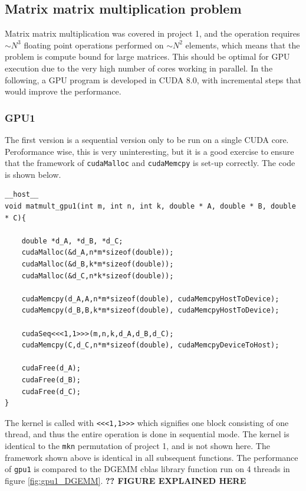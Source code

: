 \subsection{Matrix matrix multiplication problem}
Matrix matrix multiplication was covered in project 1, and the operation requires $\sim N^3$ floating point operations performed on $\sim N^2$ elements, which means that the problem is compute bound for large matrices. This should be optimal for GPU execution due to the very high number of cores working in parallel. In the following, a GPU program is developed in CUDA 8.0, with incremental steps that would improve the performance.
\subsubsection{GPU1}
The first version is a sequential version only to be run on a single CUDA core. Peroformance wise, this is very uninteresting, but it is a good exercise to ensure that the framework of \texttt{cudaMalloc} and \texttt{cudaMemcpy} is set-up correctly. The code is shown below.

\begin{lstlisting}[caption = gpu1 function with the cuda framework. The kernel \texttt{cudaSeq} is identical to the mkn permutaion from project 1.]
__host__
void matmult_gpu1(int m, int n, int k, double * A, double * B, double * C){

	double *d_A, *d_B, *d_C;
	cudaMalloc(&d_A,n*m*sizeof(double));
	cudaMalloc(&d_B,k*m*sizeof(double));
	cudaMalloc(&d_C,n*k*sizeof(double));

 	cudaMemcpy(d_A,A,n*m*sizeof(double), cudaMemcpyHostToDevice);
 	cudaMemcpy(d_B,B,k*m*sizeof(double), cudaMemcpyHostToDevice);
	
	cudaSeq<<<1,1>>>(m,n,k,d_A,d_B,d_C);
	cudaMemcpy(C,d_C,n*m*sizeof(double), cudaMemcpyDeviceToHost);

	cudaFree(d_A);
	cudaFree(d_B);
	cudaFree(d_C);
}
\end{lstlisting}
The kernel is called with \texttt{<<<1,1>>>} which signifies one block consisting of one thread, and thus the entire operation is done in sequential mode. The kernel is identical to the \texttt{mkn} permutation of project 1, and is not shown here. The framework shown above is identical in all subsequent functions. The performance of \texttt{gpu1} is compared to the DGEMM cblas library function run on 4 threads in figure \ref{fig:gpu1_DGEMM}. \textbf{?? FIGURE EXPLAINED HERE}

